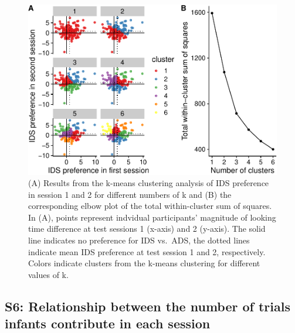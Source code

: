 \documentclass[
  man, donotrepeattitle,floatsintext]{apa6}
\begin{document}
\begin{figure}
\centering
\includegraphics{MB1T_supplement_files/figure-latex/fig2-1.pdf}
\caption{\label{fig:fig2} (A) Results from the k-means clustering analysis of IDS preference in session 1 and 2 for different numbers of k and (B) the corresponding elbow plot of the total within-cluster sum of squares. In (A), points represent indvidual participants' magnitude of looking time difference at test sessions 1 (x-axis) and 2 (y-axis). The solid line indicates no preference for IDS vs.~ADS, the dotted lines indicate mean IDS preference at test session 1 and 2, respectively. Colors indicate clusters from the k-means clustering for different values of k.}
\end{figure}

\hypertarget{s6-relationship-between-the-number-of-trials-infants-contribute-in-each-session}{%
\subsection{S6: Relationship between the number of trials infants contribute in each session}\label{s6-relationship-between-the-number-of-trials-infants-contribute-in-each-session}}
\end{document}

